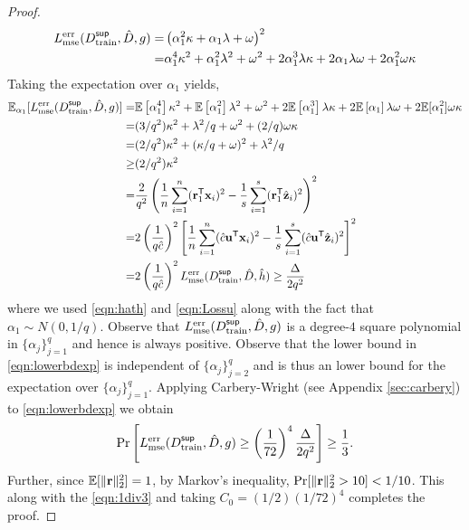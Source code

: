 \begin{proof}
    \begin{align}
         L^{\textnormal{err}}_{\textnormal{mse}}(D^{\sf sup}_{\textnormal{train}}, \hat{D}, g) =& \left(\alpha_1^2 \kappa + \alpha_1\lambda + \omega\right)^2\nonumber\\
         =& \alpha_1^4 \kappa^2 + \alpha_1^2 \lambda^2 + \omega^2 + 2\alpha_1^3 \lambda \kappa + 2 \alpha_1 \lambda\omega + 2 \alpha_1^2 \omega \kappa\nonumber
    \end{align}
    Taking the expectation over $\alpha_1$ yields,
    \begin{align}
        \mathbb{E}_{\alpha_1}[L^{\textnormal{err}}_{\textnormal{mse}}(D^{\sf sup}_{\textnormal{train}}, \hat{D}, g)] =& \mathbb{E}\left[\alpha_1^4\right]\kappa^2 + \mathbb{E}\left[\alpha_1^2\right] \lambda^2 + \omega^2 + 2\mathbb{E}\left[\alpha_1^3\right] \lambda \kappa + 2 \mathbb{E}\left[\alpha_1\right] \lambda\omega 
        + 2 \mathbb{E}[\alpha_1^2] \omega \kappa \nonumber \\
        =& (3/q^2)\kappa^2 + \lambda^2/q + \omega^2 + (2/q)\omega \kappa \nonumber \\
        =& (2/q^2)\kappa^2 + (\kappa/q + \omega)^2 + \lambda^2/q \nonumber \\
        \geq& (2/q^2)\kappa^2 \nonumber \\
        =& \frac{2}{q^2}\left(\frac{1}{n}\sum_{i=1}^n({\mathbf{r}}_1^{\sf T}{\mathbf{x}}_i)^2-\frac{1}{s}\sum_{i=1}^s({\mathbf{r}}_1^{\sf T}\hat{{\mathbf{z}}}_i)^2\right)^2 \nonumber \\
        =& 2\left(\frac{1}{q\hat{c}}\right)^2\left[\frac{1}{n}\sum_{i=1}^n(\hat{c}{\mathbf{u}}^{\sf T}{\mathbf{x}}_i)^2-\frac{1}{s}\sum_{i=1}^s(\hat{c}{\mathbf{u}}^{\sf T}\hat{{\mathbf{z}}}_i)^2\right]^2 \nonumber \\
        =& 2\left(\frac{1}{q\hat{c}}\right)^2L^{\textnormal{err}}_{\textnormal{mse}}(D^{\sf sup}_{\textnormal{train}}, \hat{D}, \hat{h})
        \geq \frac{\Delta}{2q^2} \label{eqn:lowerbdexp}
    \end{align}
    where we used \eqref{eqn:hath} and \eqref{eqn:Lossu} along with the fact that $\alpha_1 \sim N(0,1/q)$. Observe that $L^{\textnormal{err}}_{\textnormal{mse}}(D^{\sf sup}_{\textnormal{train}}, \hat{D}, g)$ is a degree-$4$ square polynomial in $\{\alpha_j\}_{j=1}^q$ and hence is always positive. Observe that the lower bound in \eqref{eqn:lowerbdexp}  is independent of $\{\alpha_j\}_{j=2}^q$ and is thus an lower bound for the expectation over $\{\alpha_j\}_{j=1}^q$. Applying Carbery-Wright (see Appendix \ref{sec:carbery}) to \eqref{eqn:lowerbdexp} we obtain
    \begin{eqnarray}
        \Pr\left[L^{\textnormal{err}}_{\textnormal{mse}}(D^{\sf sup}_{\textnormal{train}}, \hat{D}, g) \geq \left(\frac{1}{72}\right)^4\frac{\Delta}{2q^2}\right] \geq \frac{1}{3}.\label{eqn:1div3}
    \end{eqnarray}
    Further, since $\mathbb{E}[\|{\mathbf{r}}\|_2^2] = 1$, by Markov's inequality, $\Pr[\|{\mathbf{r}}\|_2^2 > 10] < 1/10$. This along with the \eqref{eqn:1div3} and taking $C_0 = (1/2)(1/72)^4$ completes the proof. 
\end{proof}
